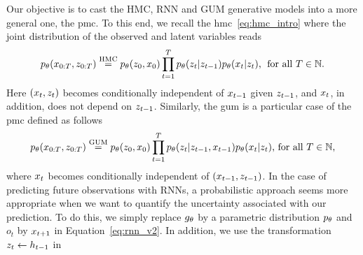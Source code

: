 Our objective is to cast the HMC, RNN and GUM generative models into
a more general one, the \gls*{pmc}. 
To this end, we recall the \gls*{hmc}~\eqref{eq:hmc_intro}
where the joint distribution of the observed and latent variables 
reads
\begin{equation*}
    p_{\theta}(x_{0:T},z_{0:T}) \overset {\rm HMC}{=} 
    p_{\theta}(z_0, x_0)\prod_{t=1}^T p_{\theta}(z_t|z_{t-1}) 
    p_{\theta}(x_t|z_{t}) \text{, } \; \text{for all } T \in \mathbb{N} \text{.}
\end{equation*}
Here $(x_t, z_t)$  becomes conditionally independent of $x_{t-1}$ given $z_{t-1}$, and 
$x_t$, in addition, does not depend on $z_{t-1}$. %
Similarly, the \gls*{gum} is a particular case of  
the \gls*{pmc} %
defined as follows
\begin{equation*}
    p_{\theta}(x_{0:T},z_{0:T})  \overset{\rm GUM}{=} p_{\theta}(z_0, x_0)
    \prod_{t=1}^T p_{\theta}(z_t|z_{t-1},x_{t-1})p_{\theta}(x_t|z_{t}) 
    \text{, }  \text{for all } T \in \mathbb{N}  \text{,}
\end{equation*}
where $x_t$ becomes conditionally
 independent of $(x_{t-1},z_{t-1})$. 
In the case of predicting future observations with RNNs,
a probabilistic approach seems more appropriate when we want to quantify 
the uncertainty associated with our prediction. To do this, we simply replace $g_{\theta}$
by a parametric distribution $p_{\theta}$  and $o_t$ by $x_{t+1}$
in Equation~\eqref{eq:rnn_v2}.
In addition, we use the transformation  $z_{t} \leftarrow h_{t-1}$   in 
